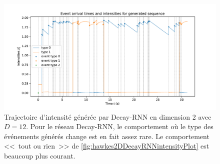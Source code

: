 \documentclass[../main.tex]{subfiles}
\begin{document}
\begin{figure}[htp]
	\includegraphics[width=\linewidth]{../results/intensity_Decay-RNN_2d_hidden12_20181201-003410_RARE_TYPESWITCH.pdf}
	\caption{Trajectoire d'intensité générée par Decay-RNN en dimension 2 avec $D=12$. Pour le réseau Decay-RNN, le comportement où le type des événements générés change est en fait assez rare. Le comportement <<~tout ou rien~>> de \cref{fig:hawkes2DDecayRNNintensityPlot} est beaucoup plus courant.}\label{fig:hawkes2DDecayRNNintensityPlotRareBehaviour}
\end{figure}
\end{document}
